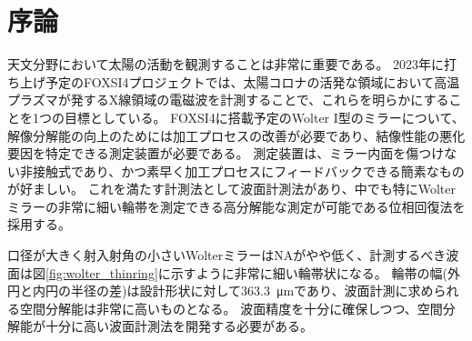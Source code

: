 \documentclass[a4j]{jarticle}
\begin{document}

\section{序論}
天文分野において太陽の活動を観測することは非常に重要である。
2023年に打ち上げ予定のFOXSI4プロジェクトでは、太陽コロナの活発な領域において高温プラズマが発するX線領域の電磁波を計測することで、これらを明らかにすることを1つの目標としている。
FOXSI4に搭載予定のWolter I型のミラーについて、解像分解能の向上のためには加工プロセスの改善が必要であり、結像性能の悪化要因を特定できる測定装置が必要である。
測定装置は、ミラー内面を傷つけない非接触式であり、かつ素早く加工プロセスにフィードバックできる簡素なものが好ましい。
これを満たす計測法として波面計測法があり、中でも特にWolterミラーの非常に細い輪帯を測定できる高分解能な測定が可能である位相回復法を採用する。

口径が大きく射入射角の小さいWolterミラーはNAがやや低く、計測するべき波面は図\ref{fig:wolter_thinring}に示すように非常に細い輪帯状になる。
輪帯の幅(外円と内円の半径の差)は設計形状に対して\SI{363.3}{\micro \metre}であり、波面計測に求められる空間分解能は非常に高いものとなる。
波面精度を十分に確保しつつ、空間分解能が十分に高い波面計測法を開発する必要がある。
\end{document}
